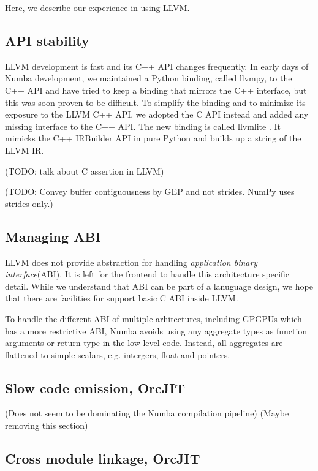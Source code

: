 \documentclass{acm_proc_article-sp}
\begin{document}
Here, we describe our experience in using LLVM.

\subsection{API stability}

LLVM development is fast and its C++ API changes frequently.
In early days of Numba development, we maintained a Python binding,
called llvmpy, to the C++ API and have tried to keep a binding that
mirrors the C++ interface, but this was soon proven to be difficult.
To simplify the binding and to minimize its exposure to the LLVM C++ API,
we adopted the C API instead and added any missing interface to the C++ API.
The new binding is called llvmlite \cite{rtd:llvmlite}.  It mimicks the
C++ IRBuilder API in pure Python and builds up a string of the LLVM IR.

(TODO: talk about C assertion in LLVM)

(TODO: Convey buffer contiguousness by GEP and not strides.
NumPy uses strides only.)

\subsection{Managing ABI}

LLVM does not provide abstraction for handling \textit{application binary
interface}(ABI). It is left for the frontend to handle this architecture
specific detail.  While we understand that ABI can be part of a lanuguage
design, we hope that there are facilities for support basic C ABI inside
LLVM.

To handle the different ABI of multiple arhitectures, including GPGPUs which
has a more restrictive ABI, Numba avoids using any aggregate types as function
arguments or return type in the low-level code.  Instead, all aggregates are
flattened to simple scalars, e.g. intergers, float and pointers.

\subsection{Slow code emission, OrcJIT}

(Does not seem to be dominating the Numba compilation pipeline)
(Maybe removing this section)

\subsection{Cross module linkage, OrcJIT}
\end{document}
